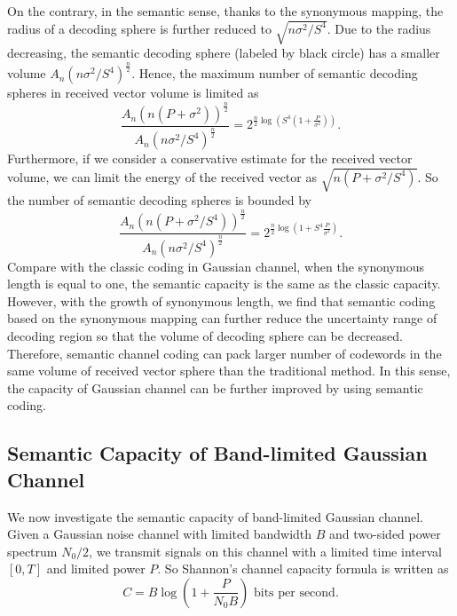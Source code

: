 \documentclass[12pt, draftclsnofoot,onecolumn]{IEEEtran}
\begin{document}
On the contrary, in the semantic sense, thanks to the synonymous mapping, the radius of a decoding sphere is further reduced to $\sqrt{n\sigma^2/S^4}$. Due to the radius decreasing, the semantic decoding sphere (labeled by black circle) has a smaller volume $A_n(n\sigma^2/S^4)^{\frac{n}{2}}$. Hence, the maximum number of semantic decoding spheres in received vector volume is limited as
\begin{equation}
\frac{A_n(n(P+\sigma^2))^{\frac{n}{2}}}{A_n(n\sigma^2/S^4)^{\frac{n}{2}}}=2^{\frac{n}{2}\log \left(S^4\left(1+\frac{P}{\sigma^2}\right)\right)}.
\end{equation}
Furthermore, if we consider a conservative estimate for the received vector volume, we can limit the energy of the received vector as $\sqrt{n(P+\sigma^2/S^4)}$. So the number of semantic decoding spheres is bounded by
\begin{equation}
\frac{A_n(n(P+\sigma^2/S^4))^{\frac{n}{2}}}{A_n(n\sigma^2/S^4)^{\frac{n}{2}}}=2^{\frac{n}{2}\log \left(1+S^4\frac{P}{\sigma^2}\right)}.
\end{equation}
Compare with the classic coding in Gaussian channel, when the synonymous length is equal to one, the semantic capacity is the same as the classic capacity. However, with the growth of synonymous length, we find that semantic coding based on the synonymous mapping can further reduce the uncertainty range of decoding region so that the volume of decoding sphere can be decreased. Therefore, semantic channel coding can pack larger number of codewords in the same volume of received vector sphere than the traditional method. In this sense, the capacity of Gaussian channel can be further improved by using semantic coding.

\subsection{Semantic Capacity of Band-limited Gaussian Channel}
We now investigate the semantic capacity of band-limited Gaussian channel. Given a Gaussian noise channel with limited bandwidth $B$ and two-sided power spectrum $N_0/2$, we transmit signals on this channel with a limited time interval $[0,T]$ and limited power $P$. So Shannon's channel capacity formula is written as
\begin{equation}
C=B\log\left(1+\frac{P}{N_0B}\right) \text{ bits per second.}
\end{equation}
\end{document}

